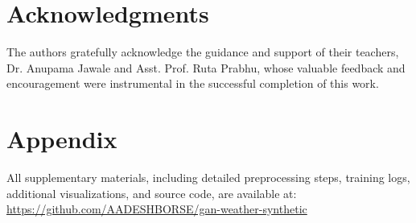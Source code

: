 \documentclass[12pt, draftclsnofoot, onecolumn]{IEEEtran}
\begin{document}
\section*{Acknowledgments}
The authors gratefully acknowledge the guidance and support of their teachers, Dr. Anupama Jawale and Asst. Prof. Ruta Prabhu, whose valuable feedback and encouragement were instrumental in the successful completion of this work.

\section*{Appendix}
All supplementary materials, including detailed preprocessing steps, training logs, additional visualizations, and source code, are available at:  
\url{https://github.com/AADESHBORSE/gan-weather-synthetic}
\end{document}
